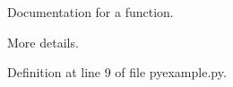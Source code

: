 Documentation for a function. 

More details. 

Definition at line 9 of file pyexample.\+py.


\begin{DoxyCode}{0}

\end{DoxyCode}
